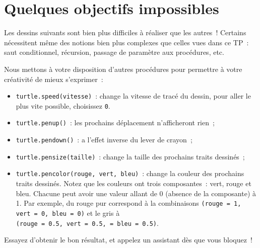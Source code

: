 \documentclass[11pt,a4paper]{article}
\begin{document}
\section{Quelques objectifs impossibles}

Les dessins suivants sont bien plus difficiles à réaliser que les autres~!
Certains nécessitent même des notions bien plus complexes que celles vues dans
ce TP~: saut conditionnel, récursion, passage de paramètre aux procédures, etc.

Nous mettons à votre disposition d'autres procédures pour permettre à
votre créativité de mieux s'exprimer~:

\begin{itemize}
    \item \lstinline{turtle.speed(vitesse)}~: change la vitesse de tracé du dessin, pour
        aller le plus vite possible, choisissez \lstinline{0}.
    \item \lstinline{turtle.penup()}~: les prochains déplacement n'afficheront rien~;
    \item \lstinline{turtle.pendown()}~: a l'effet inverse du lever de crayon~;
    \item \lstinline{turtle.pensize(taille)}~: change la taille des prochains traits
        dessinés~;
    \item \lstinline{turtle.pencolor(rouge, vert, bleu)}~: change la couleur des
        prochains traits dessinés. Notez que les couleurs ont trois
        composantes~: vert, rouge et bleu. Chacune peut avoir une valeur allant
        de 0 (absence de la composante) à 1. Par exemple, du rouge pur
        correspond à la combinaisons \lstinline{(rouge = 1, vert = 0, bleu = 0)}
        et le gris à \\ \lstinline{(rouge = 0.5, vert = 0.5, = bleu = 0.5)}.
\end{itemize}

Essayez d'obtenir le bon résultat, et appelez un assistant dès que vous
bloquez~!
\end{document}
